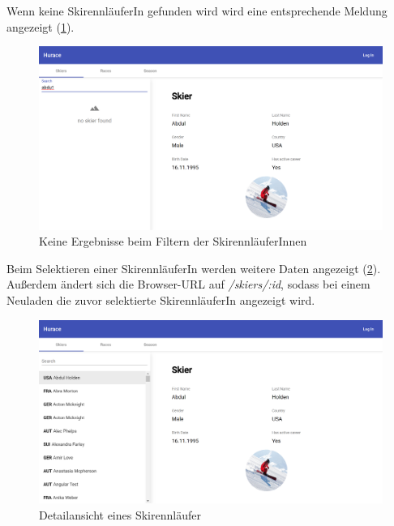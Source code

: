 Wenn keine SkirennläuferIn gefunden wird wird eine entsprechende Meldung angezeigt (\cref{fig:skiers-search-error}).
\begin{figure}[H]
    \centering
    \includegraphics[width=0.9\linewidth]{images/skiers-search-error}
    \caption{Keine Ergebnisse beim Filtern der SkirennläuferInnen}
\label{fig:skiers-search-error}
\end{figure}

Beim Selektieren einer SkirennläuferIn werden weitere Daten angezeigt (\cref{fig:skiers-detail}).
Außerdem ändert sich die Browser-URL auf \emph{/skiers/:id}, sodass bei einem Neuladen die zuvor selektierte SkirennläuferIn angezeigt wird.
\begin{figure}[H]
    \centering
    \includegraphics[width=0.9\linewidth]{images/skiers-detail}
    \caption{Detailansicht eines Skirennläufer}
\label{fig:skiers-detail}
\end{figure}

